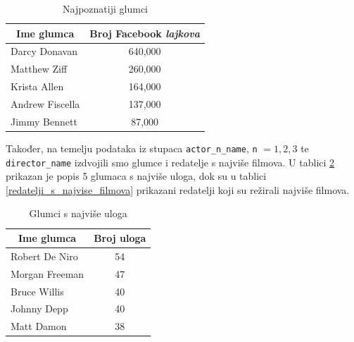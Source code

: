 	 
	 \begin{table}[H]
	 	\centering
	 	\renewcommand{\arraystretch}{1.5} %
	 	\begin{tabular}{|l|c|}
	 		\hline
	 		\multicolumn{1}{|c|}{\textbf{Ime glumca}} & \multicolumn{1}{c|}{\textbf{Broj Facebook \textit{lajkova}}} \\
	 		\hline
	 		Darcy Donavan & 640,000 \\
	 		\hline
	 		Matthew Ziff & 260,000 \\
	 		\hline			
	 		Krista Allen & 164,000 \\
	 		\hline		
	 		Andrew Fiscella & 137,000 \\
	 		\hline		
	 		Jimmy Bennett & 87,000 \\
	 		\hline
	 	\end{tabular}
	 	\caption{Najpoznatiji glumci}
	 	\label{najpoznatiji_glumci}
	 \end{table}
	 
	 Također, na temelju podataka iz stupaca \texttt{actor\_n\_name}, \texttt{n} $= 1, 2, 3$ te \texttt{director\_name} izdvojili smo glumce i redatelje s najviše filmova. U tablici \ref{glumci_s_najvise_uloga} prikazan je popis 5 glumaca s najviše uloga, dok su u tablici \ref{redatelji_s_najvise_filmova} prikazani redatelji koji su režirali najviše filmova.
	 
	  \begin{table}[H]
	 	\centering
	 	\renewcommand{\arraystretch}{1.5} %
	 	\begin{tabular}{|l|c|}
	 		\hline
	 		\multicolumn{1}{|c|}{\textbf{Ime glumca}} & \multicolumn{1}{c|}{\textbf{Broj uloga}} \\
	 		\hline
	 		Robert De Niro & 54 \\
	 		\hline
	 		Morgan Freeman & 47 \\
	 		\hline			
	 		Bruce Willis & 40 \\
	 		\hline		
	 		Johnny Depp & 40 \\
	 		\hline		
	 		Matt Damon	& 38 \\
	 		\hline
	 	\end{tabular}
	 	\caption{Glumci s najviše uloga}
	 	\label{glumci_s_najvise_uloga}
	 \end{table}
	 
